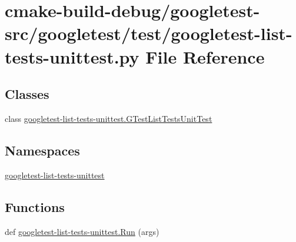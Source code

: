 \hypertarget{googletest-list-tests-unittest_8py}{}\section{cmake-\/build-\/debug/googletest-\/src/googletest/test/googletest-\/list-\/tests-\/unittest.py File Reference}
\label{googletest-list-tests-unittest_8py}
\subsection*{Classes}
\begin{DoxyCompactItemize}
\item 
class \mbox{\hyperlink{classgoogletest-list-tests-unittest_1_1GTestListTestsUnitTest}{googletest-\/list-\/tests-\/unittest.\+G\+Test\+List\+Tests\+Unit\+Test}}
\end{DoxyCompactItemize}
\subsection*{Namespaces}
\begin{DoxyCompactItemize}
\item 
 \mbox{\hyperlink{namespacegoogletest-list-tests-unittest}{googletest-\/list-\/tests-\/unittest}}
\end{DoxyCompactItemize}
\subsection*{Functions}
\begin{DoxyCompactItemize}
\item 
def \mbox{\hyperlink{namespacegoogletest-list-tests-unittest_a9e03b1bb25b16376b25e53a1927be5da}{googletest-\/list-\/tests-\/unittest.\+Run}} (args)
\end{DoxyCompactItemize}
